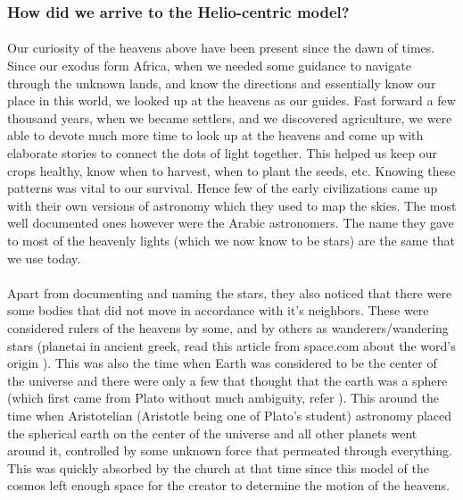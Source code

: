 \documentclass[a4paper,twoside]{article}
\numberwithin{equation}{section}
\begin{document}
\subsubsection{How did we arrive to the Helio-centric model?}
\paragraph{}
Our curiosity of the heavens above have been present since the dawn of times. Since our exodus form Africa, when we needed some guidance to navigate through the unknown lands, and know the directions and essentially know our place in this world, we looked up at the heavens as our guides. Fast forward a few thousand years, when we became settlers, and we discovered agriculture, we were able to devote much more time to look up at the heavens and come up with elaborate stories to connect the dots of light together. This helped us keep our crops healthy, know when to harvest, when to plant the seeds, etc. Knowing these patterns was vital to our survival. Hence few of the early civilizations came up with their own versions of astronomy which they used to map the skies. The most well documented ones however were the Arabic astronomers. The name they gave to most of the heavenly lights (which we now know to be stars) are the same that we use today. 
\paragraph{}
Apart from documenting and naming the stars, they also noticed that there were some bodies that did not move in accordance with it's neighbors. These were considered rulers of the heavens by some, and by others as wanderers/wandering stars (planetai in ancient greek, read this article from space.com about the word's origin \cite{Planets_1}). This was also the time when Earth was considered to be the center of the universe and there were only a few that thought that the earth was a sphere (which first came from Plato without much ambiguity, refer  \cite{wiki_planet_round}). This around the time when Aristotelian (Aristotle being one of Plato's student) astronomy placed the spherical earth on the center of the universe and all other planets went around it, controlled by some unknown force that permeated through everything. This was quickly absorbed by the church at that time since this model of the cosmos left enough space for the creator to determine the motion of the heavens.
\end{document}
